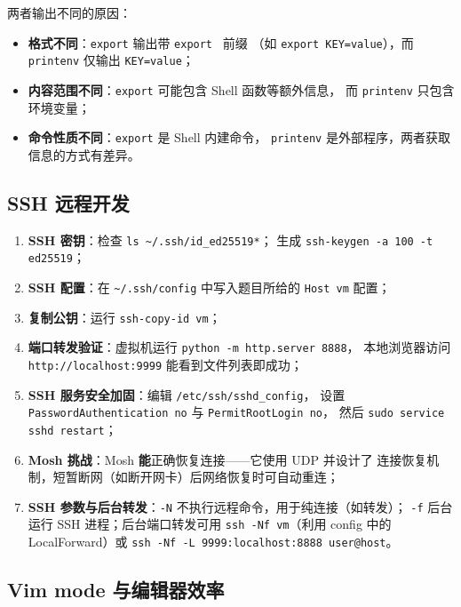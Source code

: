 \documentclass[a4paper,11pt]{ctexart}
\begin{document}
两者输出不同的原因：
\begin{itemize}
  \item \textbf{格式不同}：\texttt{export} 输出带 \texttt{export } 前缀
        （如 \texttt{export KEY=value}），而 \texttt{printenv} 仅输出 \texttt{KEY=value}；
  \item \textbf{内容范围不同}：\texttt{export} 可能包含 Shell 函数等额外信息，
        而 \texttt{printenv} 只包含环境变量；
  \item \textbf{命令性质不同}：\texttt{export} 是 Shell 内建命令，
        \texttt{printenv} 是外部程序，两者获取信息的方式有差异。
\end{itemize}

\subsection{SSH 远程开发}

\begin{enumerate}
  \item \textbf{SSH 密钥}：检查 \texttt{ls \textasciitilde/.ssh/id\_ed25519*}；
        生成 \texttt{ssh-keygen -a 100 -t ed25519}；
  \item \textbf{SSH 配置}：在 \texttt{\textasciitilde/.ssh/config} 中写入题目所给的
        \texttt{Host vm} 配置；
  \item \textbf{复制公钥}：运行 \texttt{ssh-copy-id vm}；
  \item \textbf{端口转发验证}：虚拟机运行 \texttt{python -m http.server 8888}，
        本地浏览器访问 \texttt{http://localhost:9999} 能看到文件列表即成功；
  \item \textbf{SSH 服务安全加固}：编辑 \texttt{/etc/ssh/sshd\_config}，
        设置 \texttt{PasswordAuthentication no} 与 \texttt{PermitRootLogin no}，
        然后 \texttt{sudo service sshd restart}；
  \item \textbf{Mosh 挑战}：Mosh \textbf{能}正确恢复连接——它使用 UDP 并设计了
        连接恢复机制，短暂断网（如断开网卡）后网络恢复时可自动重连；
  \item \textbf{SSH 参数与后台转发}：\texttt{-N} 不执行远程命令，用于纯连接（如转发）；
        \texttt{-f} 后台运行 SSH 进程；后台端口转发可用
        \texttt{ssh -Nf vm}（利用 config 中的 LocalForward）或
        \texttt{ssh -Nf -L 9999:localhost:8888 user@host}。
\end{enumerate}

\subsection{Vim mode 与编辑器效率}
\end{document}

